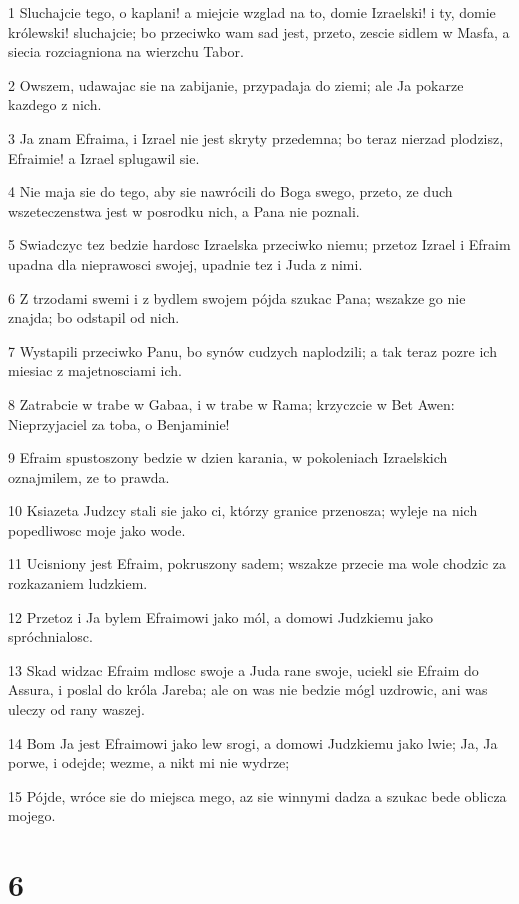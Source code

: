 \par 1 Sluchajcie tego, o kaplani! a miejcie wzglad na to, domie Izraelski! i ty, domie królewski! sluchajcie; bo przeciwko wam sad jest, przeto, zescie sidlem w Masfa, a siecia rozciagniona na wierzchu Tabor.
\par 2 Owszem, udawajac sie na zabijanie, przypadaja do ziemi; ale Ja pokarze kazdego z nich.
\par 3 Ja znam Efraima, i Izrael nie jest skryty przedemna; bo teraz nierzad plodzisz, Efraimie! a Izrael splugawil sie.
\par 4 Nie maja sie do tego, aby sie nawrócili do Boga swego, przeto, ze duch wszeteczenstwa jest w posrodku nich, a Pana nie poznali.
\par 5 Swiadczyc tez bedzie hardosc Izraelska przeciwko niemu; przetoz Izrael i Efraim upadna dla nieprawosci swojej, upadnie tez i Juda z nimi.
\par 6 Z trzodami swemi i z bydlem swojem pójda szukac Pana; wszakze go nie znajda; bo odstapil od nich.
\par 7 Wystapili przeciwko Panu, bo synów cudzych naplodzili; a tak teraz pozre ich miesiac z majetnosciami ich.
\par 8 Zatrabcie w trabe w Gabaa, i w trabe w Rama; krzyczcie w Bet Awen: Nieprzyjaciel za toba, o Benjaminie!
\par 9 Efraim spustoszony bedzie w dzien karania, w pokoleniach Izraelskich oznajmilem, ze to prawda.
\par 10 Ksiazeta Judzcy stali sie jako ci, którzy granice przenosza; wyleje na nich popedliwosc moje jako wode.
\par 11 Ucisniony jest Efraim, pokruszony sadem; wszakze przecie ma wole chodzic za rozkazaniem ludzkiem.
\par 12 Przetoz i Ja bylem Efraimowi jako mól, a domowi Judzkiemu jako spróchnialosc.
\par 13 Skad widzac Efraim mdlosc swoje a Juda rane swoje, uciekl sie Efraim do Assura, i poslal do króla Jareba; ale on was nie bedzie mógl uzdrowic, ani was uleczy od rany waszej.
\par 14 Bom Ja jest Efraimowi jako lew srogi, a domowi Judzkiemu jako lwie; Ja, Ja porwe, i odejde; wezme, a nikt mi nie wydrze;
\par 15 Pójde, wróce sie do miejsca mego, az sie winnymi dadza a szukac bede oblicza mojego.

\chapter{6}

